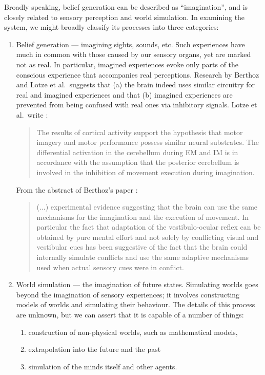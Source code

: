 Broadly speaking, belief generation can be described as ``imagination'', and is closely related to sensory perception and world simulation. In examining the system, we might broadly classify its processes into three categories:

\begin{enumerate}
	\item Belief generation --- imagining sights, sounds, etc. Such experiences have much in common with those caused by our sensory organs, yet are marked not as real. In particular, imagined experiences evoke only parts of the conscious experience that accompanies real perceptions. Research by Berthoz and Lotze et al.\ suggests that (a) the brain indeed uses similar circuitry for real and imagined experiences and that (b) imagined experiences are prevented from being confused with real ones via inhibitory signals. Lotze et al.\ write \cite{lotze1999}:
	\begin{quote}
		The results of cortical activity support the hypothesis that motor imagery and motor performance possess similar neural substrates. The differential activation in the cerebellum during EM and IM is in accordance with the assumption that the posterior cerebellum is involved in the inhibition of movement execution during imagination.
	\end{quote}
	
	From the abstract of Berthoz's paper \cite{8713551}:
	
	\begin{quotation}
		(...) experimental evidence suggesting that the brain can use the same mechanisms for the imagination and the execution of movement. In particular the fact that adaptation of the vestibulo-ocular reflex can be obtained by pure mental effort and not solely by conflicting visual and vestibular cues has been suggestive of the fact that the brain could internally simulate conflicts and use the same adaptive mechanisms used when actual sensory cues were in conflict.
	\end{quotation}
	
	\item World simulation --- the imagination of future states. Simulating worlds goes beyond the imagination of sensory experiences; it involves constructing models of worlds and simulating their behaviour. The details of this process are unknown, but we can assert that it is capable of a number of things:
	\begin{enumerate}
		\item construction of non-physical worlds, such as mathematical models,
		\item extrapolation into the future and the past
		\item simulation of the minds itself and other agents.
	\end{enumerate}
	

\end{enumerate}
